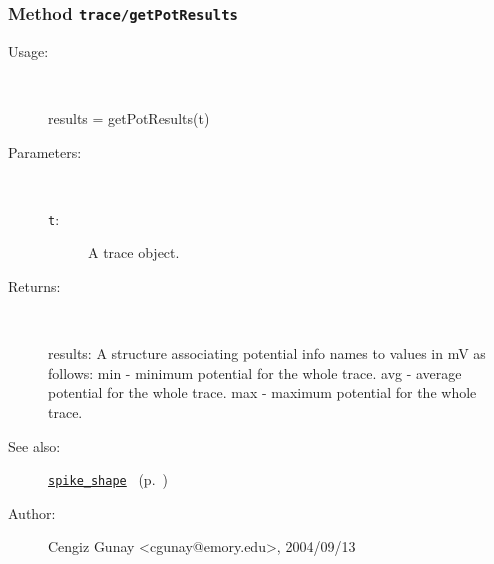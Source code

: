 \subsubsection[Method \texttt{getPotResults}]{Method \texttt{trace/getPotResults}}%
%
\label{ref_trace__getPotResults}%
\hypertarget{ref_trace__getPotResults}{}%
\begin{description}
%
\item[Usage:]~%
\begin{lyxcode}%
results = getPotResults(t)
%
\end{lyxcode}%
%
%
\item[Parameters:]~
\begin{description}%
\item[\texttt{t}:]
 A trace object.
\end{description}%
%
\item[Returns:
]~

	results: A structure associating potential info names to values in mV as
		 follows:
	   min - minimum potential for the whole trace.
	   avg - average potential for the whole trace.
	   max - maximum potential for the whole trace.
%
%
\item[See also:]%
\hyperlink{ref_spike_shape}{\texttt{spike\_shape}}%
\ (p.~\pageref{ref_spike_shape})%
%
%
\item[Author:]%
Cengiz Gunay <cgunay@emory.edu>, 2004/09/13
%
\end{description}
\methodline%
